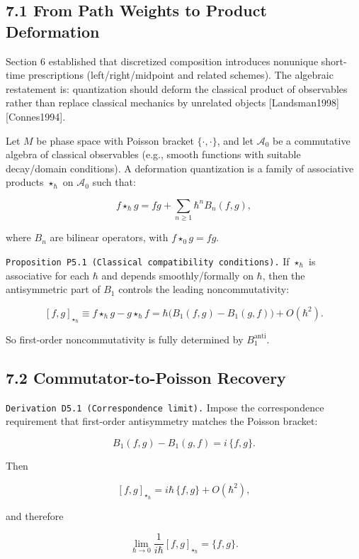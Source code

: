 \documentclass[
]{article}
\begin{document}
\subsection{7.1 From Path Weights to Product
Deformation}\label{from-path-weights-to-product-deformation}

Section 6 established that discretized composition introduces nonunique
short-time prescriptions (left/right/midpoint and related schemes). The
algebraic restatement is: quantization should deform the classical
product of observables rather than replace classical mechanics by
unrelated objects {[}Landsman1998{]} {[}Connes1994{]}.

Let \(M\) be phase space with Poisson bracket \(\{\cdot,\cdot\}\), and
let \(\mathcal A_0\) be a commutative algebra of classical observables
(e.g., smooth functions with suitable decay/domain conditions). A
deformation quantization is a family of associative products
\(\star_\hbar\) on \(\mathcal A_0\) such that:

\[
f\star_\hbar g
=
fg+\sum_{n\ge 1}\hbar^n B_n(f,g),
\]

where \(B_n\) are bilinear operators, with \(f\star_0 g=fg\).

\texttt{Proposition\ P5.1\ (Classical\ compatibility\ conditions).} If
\(\star_\hbar\) is associative for each \(\hbar\) and depends
smoothly/formally on \(\hbar\), then the antisymmetric part of \(B_1\)
controls the leading noncommutativity:

\[
[f,g]_{\star_\hbar}
\equiv
f\star_\hbar g-g\star_\hbar f
=
\hbar\big(B_1(f,g)-B_1(g,f)\big)+O(\hbar^2).
\]

So first-order noncommutativity is fully determined by
\(B_1^{\mathrm{anti}}\).

\subsection{7.2 Commutator-to-Poisson
Recovery}\label{commutator-to-poisson-recovery}

\texttt{Derivation\ D5.1\ (Correspondence\ limit).} Impose the
correspondence requirement that first-order antisymmetry matches the
Poisson bracket:

\[
B_1(f,g)-B_1(g,f)=i\,\{f,g\}.
\]

Then

\[
[f,g]_{\star_\hbar}
=
i\hbar\,\{f,g\}+O(\hbar^2),
\]

and therefore

\[
\lim_{\hbar\to0}
\frac{1}{i\hbar}[f,g]_{\star_\hbar}
=
\{f,g\}.
\]
\end{document}
